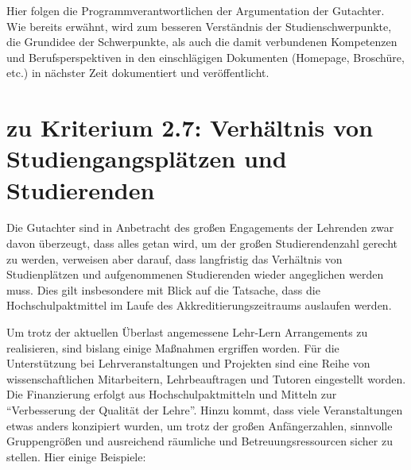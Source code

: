 Hier folgen die Programmverantwortlichen der Argumentation der
Gutachter. Wie bereits erwähnt, wird zum besseren Verständnis der
Studienschwerpunkte, die Grundidee der Schwerpunkte, als auch die damit
verbundenen Kompetenzen und Berufsperspektiven in den einschlägigen
Dokumenten (Homepage, Broschüre, etc.) in nächster Zeit dokumentiert und
veröffentlicht.

\section{zu Kriterium 2.7: Verhältnis von Studiengangsplätzen und
Studierenden}\label{zu-kriterium-2.7-verhuxe4ltnis-von-studiengangspluxe4tzen-und-studierenden}

\begin{siderules}
Die Gutachter sind in Anbetracht des großen Engagements der Lehrenden
zwar davon überzeugt, dass alles getan wird, um der großen
Studierendenzahl gerecht zu werden, verweisen aber darauf, dass
langfristig das Verhältnis von Studienplätzen und aufgenommenen
Studierenden wieder angeglichen werden muss. Dies gilt insbesondere mit
Blick auf die Tatsache, dass die Hochschulpaktmittel im Laufe des
Akkreditierungszeitraums auslaufen werden.
\end{siderules}

Um trotz der aktuellen Überlast angemessene Lehr-Lern Arrangements zu
realisieren, sind bislang einige Maßnahmen ergriffen worden. Für die
Unterstützung bei Lehrveranstaltungen und Projekten sind eine Reihe von
wissenschaftlichen Mitarbeitern, Lehrbeauftragen und Tutoren eingestellt
worden. Die Finanzierung erfolgt aus Hochschulpaktmitteln und Mitteln
zur ``Verbesserung der Qualität der Lehre''. Hinzu kommt, dass viele
Veranstaltungen etwas anders konzipiert wurden, um trotz der großen
Anfängerzahlen, sinnvolle Gruppengrößen und ausreichend räumliche und
Betreuungsressourcen sicher zu stellen. Hier einige Beispiele:

